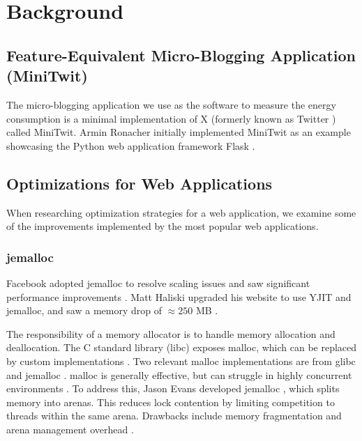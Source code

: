 \documentclass[main.tex]{subfiles}
\begin{document}
\section{Background}
\label{section:background}

\subsection{Feature-Equivalent Micro-Blogging Application (MiniTwit)}

The micro-blogging application we use as the software to measure the energy consumption is a minimal implementation of X (formerly known as Twitter \cite{verge-twitter-rebrand-x}) called MiniTwit. Armin Ronacher initially implemented MiniTwit as an example showcasing the Python web application framework Flask \cite{ronacher-minitwit-commit}. 

\subsection{Optimizations for Web Applications}

When researching optimization strategies for a web application, we examine some of the improvements implemented by the most popular web applications.

\subsubsection{jemalloc}

Facebook adopted jemalloc to resolve scaling issues and saw significant performance improvements \cite{facebook-jemalloc}. Matt Haliski upgraded his website to use YJIT and jemalloc, and saw a memory drop of $\approx 250$ MB \cite{matt-haliski-yjit-jemalloc-upgarde}. 

The responsibility of a memory allocator is to handle memory allocation and deallocation. The C standard library (libc) \cite{c-language-iso9899-2024} exposes malloc, which can be replaced by custom implementations \cite{Berger_Zorn_McKinley}. Two relevant malloc implementations are from glibc \cite{glibc} and jemalloc \cite{evans2006scalable}. malloc is generally effective, but can struggle in highly concurrent environments \cite{evans2006scalable}. To address this, Jason Evans developed jemalloc \cite{evans2006scalable}, which splits memory into arenas. This reduces lock contention by limiting competition to threads within the same arena. Drawbacks include memory fragmentation and arena management overhead \cite{evans2006scalable}.
\end{document}
